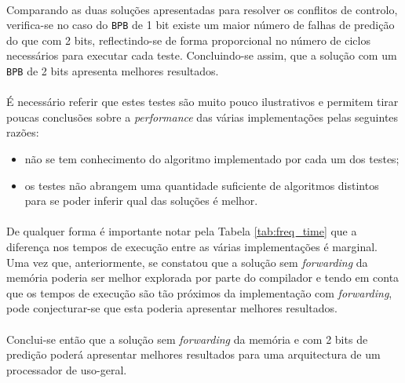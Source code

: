 \paragraph{} Comparando as duas soluções apresentadas para resolver os conflitos de controlo, verifica-se no caso do \texttt{BPB} de 1 bit existe um maior número de falhas de predição do que com 2 bits, reflectindo-se de forma proporcional no número de ciclos necessários para executar cada teste. Concluindo-se assim, que a solução com um \texttt{BPB} de 2 bits apresenta melhores resultados.

\paragraph{} É necessário referir que estes testes são muito pouco ilustrativos e permitem tirar poucas conclusões sobre a \textit{performance} das várias implementações pelas seguintes razões:

\begin{itemize}
\item não se tem conhecimento do algoritmo implementado por cada um dos testes;
\item os testes não abrangem uma quantidade suficiente de algoritmos distintos para se poder inferir qual das soluções é melhor.
\end{itemize}

\paragraph{} De qualquer forma é importante notar pela Tabela \ref{tab:freq_time} que a diferença nos tempos de execução entre as várias implementações é marginal. Uma vez que, anteriormente, se constatou que a solução sem \textit{forwarding} da memória poderia ser melhor explorada por parte do compilador e tendo em conta que os tempos de execução são tão próximos da implementação com \textit{forwarding}, pode conjecturar-se que esta poderia apresentar melhores resultados.

\paragraph{} Conclui-se então que a solução sem \textit{forwarding} da memória e com 2 bits de predição poderá apresentar melhores resultados para uma arquitectura de um processador de uso-geral.
